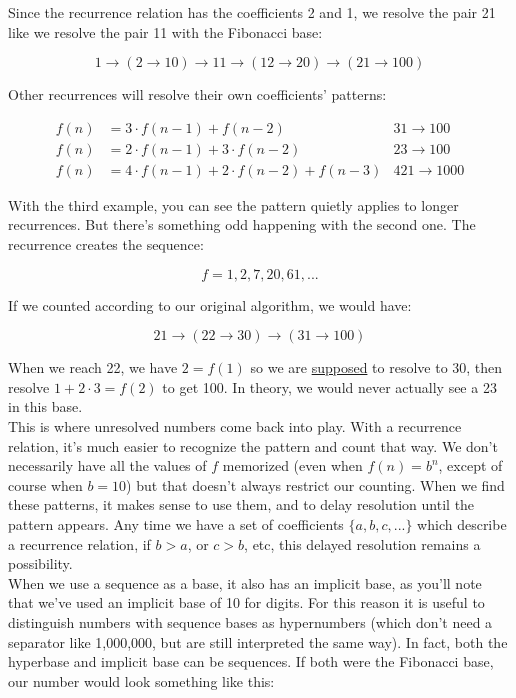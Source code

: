 \documentclass{article}
\begin{document}
\noindent Since the recurrence relation has the coefficients 2 and 1, we resolve the pair 21 like we resolve the pair 11 with the Fibonacci base:

$$1 \rightarrow (2 \rightarrow 10) \rightarrow 11 \rightarrow (12 \rightarrow 20) \rightarrow (21 \rightarrow 100)$$

\noindent Other recurrences will resolve their own coefficients' patterns:

\begin{align*}
f(n) &= 3 \cdot f(n-1) + f(n-2) & 31 \rightarrow 100\\
f(n) &= 2 \cdot f(n-1) + 3 \cdot f(n-2) & 23 \rightarrow 100\\
f(n) &= 4 \cdot f(n-1) + 2 \cdot f(n-2) + f(n-3) & 421 \rightarrow 1000
\end{align*}

\noindent With the third example, you can see the pattern quietly applies to longer recurrences. But there's something odd happening with the second one. The recurrence creates the sequence:

$$f = 1, 2, 7, 20, 61, ...$$

\noindent  If we counted according to our original algorithm, we would have:

$$21 \rightarrow (22 \rightarrow 30) \rightarrow (31 \rightarrow 100)$$

\noindent When we reach 22, we have $2 = f(1)$ so we are \underline{supposed} to resolve to 30, then resolve $1 + 2 \cdot 3 = f(2)$ to get 100. In theory, we would never actually see a 23 in this base.\\

\noindent This is where unresolved numbers come back into play. With a recurrence relation, it's much easier to recognize the pattern and count that way. We don't necessarily have all the values of $f$ memorized (even when $f(n) = b^n$, except of course when $b = 10$) but that doesn't always restrict our counting. When we find these patterns, it makes sense to use them, and to delay resolution until the pattern appears. Any time we have a set of coefficients $\{a, b, c, ...\}$ which describe a recurrence relation, if $b > a$, or $c > b$, etc, this delayed resolution remains a possibility.\\

\noindent When we use a sequence as a base, it also has an implicit base, as you'll note that we've used an implicit base of 10 for digits. For this reason it is useful to distinguish numbers with sequence bases as hypernumbers (which don't need a separator like 1,000,000, but are still interpreted the same way). In fact, both the hyperbase and implicit base can be sequences. If both were the Fibonacci base, our number would look something like this:
\end{document}
